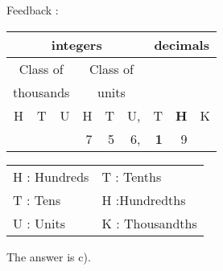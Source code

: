 \documentclass[letterpaper, 12pt]{article}
\begin{document}
Feedback :\\
\begin{center}
\begin{tabular}{|rrr|rrr|rrr|}
\hline
\multicolumn{6}{|c|}{integers} &\multicolumn{3}{|c|}{decimals} \\
\hline
\multicolumn{3}{|c|}{Class of} &\multicolumn{3}{|c|}{Class of} &  \multicolumn{3}{c|}{} \\
\multicolumn{3}{|c|}{thousands} &\multicolumn{3}{|c|}{units} &  \multicolumn{3}{c|}{} \\
\hline
H & T & U &H & T & U, & T\up{th} & \textbf{H\up{th}} & K\up{th} \\
\hline
\hline
 & & & 7 & 5 & 6, & \textbf{1} & 9 & \\
\hline
\end{tabular}
\end{center}

\scriptsize
\begin{center}
\begin{tabular}{ll}
H : Hundreds & T\up{th} : Tenths\\
T : Tens & H\up{th} :Hundredths\\
U : Units & K\up{e} : Thousandths\\
\end{tabular}
\end{center}

\normalsize
The answer is c).\\
\end{document}
